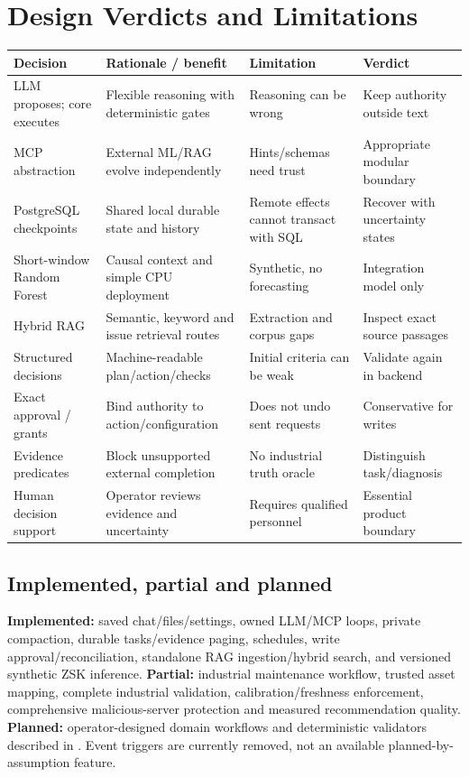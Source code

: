 \chapter{Design Verdicts and Limitations}
\par\smallskip\noindent\begin{tabularx}{\linewidth}{@{}p{.21\linewidth}XXp{.23\linewidth}@{}}\toprule
Decision & Rationale / benefit & Limitation & Verdict\\\midrule
LLM proposes; core executes & Flexible reasoning with deterministic gates & Reasoning can be wrong & Keep authority outside text\\
MCP abstraction & External ML/RAG evolve independently & Hints/schemas need trust & Appropriate modular boundary\\
PostgreSQL checkpoints & Shared local durable state and history & Remote effects cannot transact with SQL & Recover with uncertainty states\\
Short-window Random Forest & Causal context and simple CPU deployment & Synthetic, no forecasting & Integration model only\\
Hybrid RAG & Semantic, keyword and issue retrieval routes & Extraction and corpus gaps & Inspect exact source passages\\
Structured decisions & Machine-readable plan/action/checks & Initial criteria can be weak & Validate again in backend\\
Exact approval / grants & Bind authority to action/configuration & Does not undo sent requests & Conservative for writes\\
Evidence predicates & Block unsupported external completion & No industrial truth oracle & Distinguish task/diagnosis\\
Human decision support & Operator reviews evidence and uncertainty & Requires qualified personnel & Essential product boundary\\\bottomrule
\end{tabularx}\par\smallskip
\section{Implemented, partial and planned}
\textbf{Implemented:} saved chat/files/settings, owned LLM/MCP loops, private compaction, durable tasks/evidence paging, schedules, write approval/reconciliation, standalone RAG ingestion/hybrid search, and versioned synthetic ZSK inference. \textbf{Partial:} industrial maintenance workflow, trusted asset mapping, complete industrial validation, calibration/freshness enforcement, comprehensive malicious-server protection and measured recommendation quality. \textbf{Planned:} operator-designed domain workflows and deterministic validators described in . Event triggers are currently removed, not an available planned-by-assumption feature.
